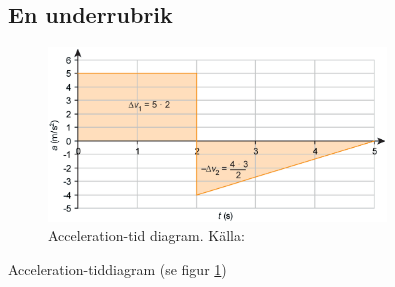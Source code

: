 \documentclass[11p]{article}
\begin{document}
\subsection{En underrubrik}
    \begin{figure}[!h]
        \includegraphics[width=0.8\textwidth]{accelerationTime.png}
        \caption{Acceleration-tid diagram. Källa: \textcite{Fraenkel}}
        \label{fig:acc}
    \end{figure}

Acceleration-tiddiagram (se figur \ref{fig:acc})

\printbibliography
\end{document}
